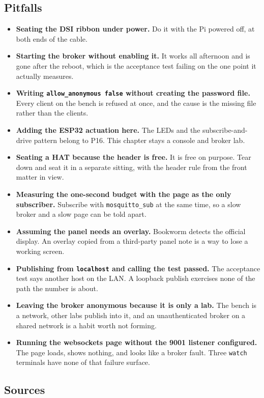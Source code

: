 \subsection*{Pitfalls}

\begin{itemize}
\item \textbf{Seating the DSI ribbon under power.} Do it with the Pi powered off, at both ends of the cable.
\item \textbf{Starting the broker without enabling it.} It works all afternoon and is gone after the reboot, which is the acceptance test failing on the one point it actually measures.
\item \textbf{Writing \texttt{allow\_anonymous false} without creating the password file.} Every client on the bench is refused at once, and the cause is the missing file rather than the clients.
\item \textbf{Adding the ESP32 actuation here.} The LEDs and the subscribe-and-drive pattern belong to P16. This chapter stays a console and broker lab.
\item \textbf{Seating a HAT because the header is free.} It is free on purpose. Tear down and seat it in a separate sitting, with the header rule from the front matter in view.
\item \textbf{Measuring the one-second budget with the page as the only subscriber.} Subscribe with \texttt{mosquitto\_sub} at the same time, so a slow broker and a slow page can be told apart.
\item \textbf{Assuming the panel needs an overlay.} Bookworm detects the official display. An overlay copied from a third-party panel note is a way to lose a working screen.
\item \textbf{Publishing from \texttt{localhost} and calling the test passed.} The acceptance test says another host on the LAN. A loopback publish exercises none of the path the number is about.
\item \textbf{Leaving the broker anonymous because it is only a lab.} The bench is a network, other labs publish into it, and an unauthenticated broker on a shared network is a habit worth not forming.
\item \textbf{Running the websockets page without the 9001 listener configured.} The page loads, shows nothing, and looks like a broker fault. Three \texttt{watch} terminals have none of that failure surface.
\end{itemize}

\subsection*{Sources}

